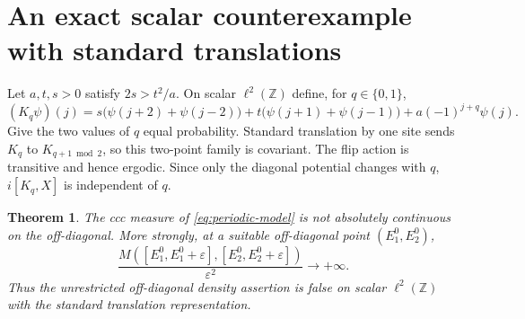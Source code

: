 \documentclass[10pt]{article}
\newtheorem{theorem}{Theorem}
\newcommand{\Z}{\mathbb Z}
\begin{document}
\section{An exact scalar counterexample with standard translations}

Let $a,t,s>0$ satisfy $2s>t^2/a$. On scalar $\ell^2(\Z)$ define, for
$q\in\{0,1\}$,
\begin{equation}\label{eq:periodic-model}
 (K_q\psi)(j)=s\bigl(\psi(j+2)+\psi(j-2)\bigr)
 +t\bigl(\psi(j+1)+\psi(j-1)\bigr)+a(-1)^{j+q}\psi(j).
\end{equation}
Give the two values of $q$ equal probability. Standard translation by one
site sends $K_q$ to $K_{q+1\bmod2}$, so this two-point family is covariant.
The flip action is transitive and hence ergodic. Since only the diagonal
potential changes with $q$, $i[K_q,X]$ is independent of $q$.

\begin{theorem}\label{thm:periodic}
The ccc measure of \eqref{eq:periodic-model} is not absolutely continuous on
the off-diagonal. More strongly, at a suitable off-diagonal point
$(E_1^0,E_2^0)$,
\[
 \frac{M([E_1^0,E_1^0+\varepsilon],
             [E_2^0,E_2^0+\varepsilon])}{\varepsilon^2}
 \longrightarrow+\infty.
\]
Thus the unrestricted off-diagonal density assertion is false on scalar
$\ell^2(\Z)$ with the standard translation representation.
\end{theorem}
\end{document}
